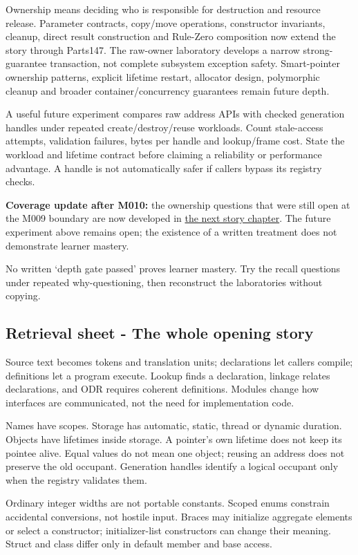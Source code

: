 Ownership means deciding who is responsible for destruction and resource release. Parameter contracts, copy/move operations, constructor invariants, cleanup, direct result construction and Rule-Zero composition now extend the story through Parts147. The raw-owner laboratory develops a narrow strong-guarantee transaction, not complete subsystem exception safety. Smart-pointer ownership patterns, explicit lifetime restart, allocator design, polymorphic cleanup and broader container/concurrency guarantees remain future depth.

A useful future experiment compares raw address APIs with checked generation handles under repeated create/destroy/reuse workloads. Count stale-access attempts, validation failures, bytes per handle and lookup/frame cost. State the workload and lifetime contract before claiming a reliability or performance advantage. A handle is not automatically safer if callers bypass its registry checks.

\textbf{Coverage update after M010:} the ownership questions that were still open at the M009 boundary are now developed in \hyperref[05-engine-i-ch004]{the next story chapter}. The future experiment above remains open; the existence of a written treatment does not demonstrate learner mastery.

No written `depth gate passed' proves learner mastery. Try the recall questions under repeated why-questioning, then reconstruct the laboratories without copying.

\subsection{Retrieval sheet - The whole opening story}\label{retrieval-sheet---the-whole-opening-story}

Source text becomes tokens and translation units; declarations let callers compile; definitions let a program execute. Lookup finds a declaration, linkage relates declarations, and ODR requires coherent definitions. Modules change how interfaces are communicated, not the need for implementation code.

Names have scopes. Storage has automatic, static, thread or dynamic duration. Objects have lifetimes inside storage. A pointer's own lifetime does not keep its pointee alive. Equal values do not mean one object; reusing an address does not preserve the old occupant. Generation handles identify a logical occupant only when the registry validates them.

Ordinary integer widths are not portable constants. Scoped enums constrain accidental conversions, not hostile input. Braces may initialize aggregate elements or select a constructor; initializer-list constructors can change their meaning. Struct and class differ only in default member and base access.

